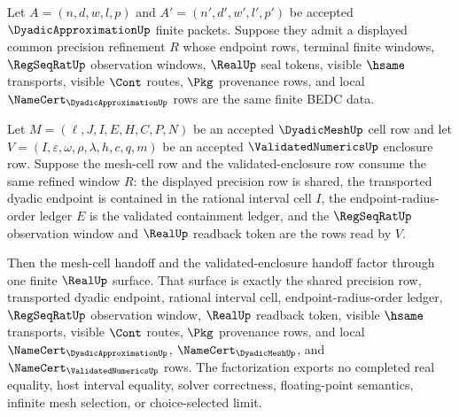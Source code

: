 \begin{theorem}
\label{thm:dyadicapproximation-common-refinement-enclosure-handoff}
Let $A=(n,d,w,l,p)$ and $A'=(n',d',w',l',p')$ be accepted
$\DyadicApproximationUp$ finite packets. Suppose they admit a displayed common
precision refinement $R$ whose endpoint rows, terminal finite windows,
$\RegSeqRatUp$ observation windows, $\RealUp$ seal tokens, visible $\hsame$
transports, visible $\Cont$ routes, $\Pkg$ provenance rows, and local
$\NameCert_{\DyadicApproximationUp}$ rows are the same finite BEDC data.

Let $M=(\ell,J,I,E,H,C,P,N)$ be an accepted $\DyadicMeshUp$ cell row and let
$V=(I,\varepsilon,\omega,\rho,\lambda,h,c,q,m)$ be an accepted
$\ValidatedNumericsUp$ enclosure row. Suppose the mesh-cell row and the
validated-enclosure row consume the same refined window $R$: the displayed
precision row is shared, the transported dyadic endpoint is contained in the
rational interval cell $I$, the endpoint-radius-order ledger $E$ is the
validated containment ledger, and the $\RegSeqRatUp$ observation window and
$\RealUp$ readback token are the rows read by $V$.

Then the mesh-cell handoff and the validated-enclosure handoff factor through
one finite $\RealUp$ surface. That surface is exactly the shared precision row,
transported dyadic endpoint, rational interval cell, endpoint-radius-order
ledger, $\RegSeqRatUp$ observation window, $\RealUp$ readback token, visible
$\hsame$ transports, visible $\Cont$ routes, $\Pkg$ provenance rows, and local
$\NameCert_{\DyadicApproximationUp}$, $\NameCert_{\DyadicMeshUp}$, and
$\NameCert_{\ValidatedNumericsUp}$ rows. The factorization exports no completed
real equality, host interval equality, solver correctness, floating-point
semantics, infinite mesh selection, or choice-selected limit.
\end{theorem}
